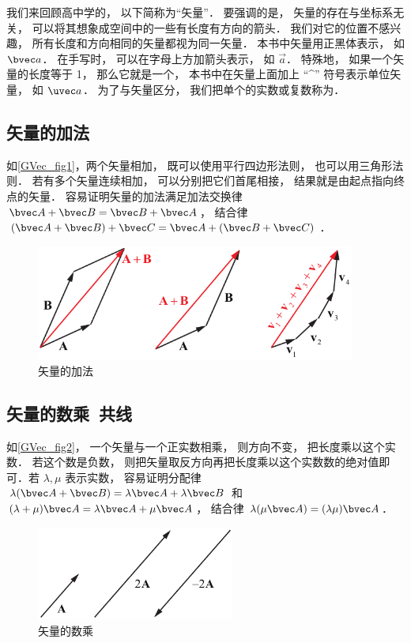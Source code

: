 
我们来回顾高中学的， 以下简称为“矢量”． 要强调的是， 矢量的存在与坐标系无关， 可以将其想象成空间中的一些有长度有方向的箭头． 我们对它的位置不感兴趣， 所有长度和方向相同的矢量都视为同一矢量． 本书中矢量用正黑体表示， 如 $\bvec a$． 在手写时， 可以在字母上方加箭头表示， 如 $\overrightarrow{a}$． 特殊地， 如果一个矢量的长度等于 1， 那么它就是一个， 本书中在矢量上面加上 “\^{}” 符号表示单位矢量， 如 $\uvec a$． 为了与矢量区分， 我们把单个的实数或复数称为．

\subsection{矢量的加法}
如\autoref{GVec_fig1}，两个矢量相加， 既可以使用平行四边形法则， 也可以用三角形法则． 若有多个矢量连续相加， 可以分别把它们首尾相接， 结果就是由起点指向终点的矢量． 容易证明矢量的加法满足加法交换律 $\bvec A + \bvec B = \bvec B + \bvec A$， 结合律 $(\bvec A + \bvec B) + \bvec C = \bvec A + (\bvec B + \bvec C)$．
\begin{figure}[ht]
\centering
\includegraphics[width=10.5cm]{./figures/GVec1.pdf}
\caption{矢量的加法} \label{GVec_fig1}
\end{figure}

\subsection{矢量的数乘\ 共线}
如\autoref{GVec_fig2}， 一个矢量与一个正实数相乘， 则方向不变， 把长度乘以这个实数． 若这个数是负数， 则把矢量取反方向再把长度乘以这个实数数的绝对值即可．若 $\lambda, \mu$ 表示实数， 容易证明分配律 $\lambda(\bvec A + \bvec B) = \lambda\bvec A + \lambda\bvec B$ 和 $(\lambda+\mu)\bvec A = \lambda\bvec A + \mu\bvec A$， 结合律 $\lambda(\mu\bvec A) = (\lambda\mu) \bvec A$．
\begin{figure}[ht]
\centering
\includegraphics[width=6.5cm]{./figures/GVec2.pdf}
\caption{矢量的数乘} \label{GVec_fig2}
\end{figure}

